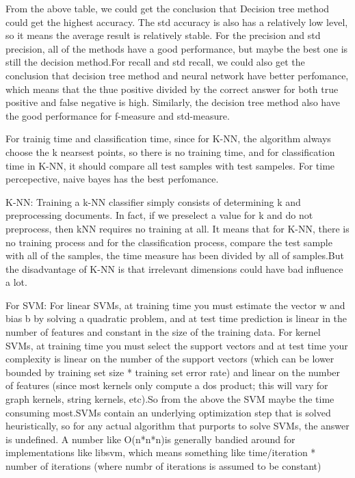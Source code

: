 \documentclass[]{article}
\begin{document}
From the above table, we could get the conclusion that Decision tree method could get the highest accuracy. The std accuracy is also has a relatively low level, so it means the average result is relatively stable. For the precision and std precision, all of the methods have a good performance, but maybe the best one is still the decision method.For recall and std recall, we could also get the conclusion that decision tree method and neural network have better perfomance, which means that the thue positive divided by the correct answer for both true positive and false negative is high. Similarly, the decision tree method also have the good performance for f-measure and std-measure.

For trainig time and classification time, since for K-NN, the algorithm always choose the k nearsest points, so there is no training time, and for classification time in K-NN, it should compare all test samples with test sampeles. For time percepective, naive bayes has the best perfomance. 

K-NN: Training a k-NN classifier simply consists of determining k and preprocessing documents. In fact, if we preselect a value for k and do not preprocess, then kNN requires no training at all. It means that for K-NN, there is no training process and for the classification process, compare the test sample with all of the samples, the time measure has been divided by all of samples.But the disadvantage of K-NN is that irrelevant dimensions could have bad influence a lot.

For SVM: For linear SVMs, at training time you must estimate the vector w and bias b by solving a quadratic problem, and at test time prediction is linear in the number of features and constant in the size of the training data. For kernel SVMs, at training time you must select the support vectors and at test time your complexity is linear on the number of the support vectors (which can be lower bounded by training set size * training set error rate) and linear on the number of features (since most kernels only compute a dos product; this will vary for graph kernels, string kernels, etc).So from the above the SVM maybe the time consuming most.SVMs contain an underlying optimization step that is solved heuristically, so for any actual algorithm that purports to solve SVMs, the answer is undefined. A number like O(n*n*n)is generally bandied around for implementations like libsvm, which means something like time/iteration * number of iterations (where numbr of  iterations is assumed to be constant)
\end{document}
